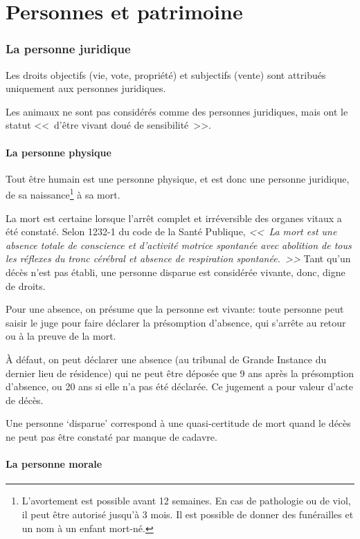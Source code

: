 \documentclass[10pt,a4paper]{article}
\begin{document}
\part{Personnes et patrimoine}

\section{La personne juridique}

Les droits objectifs (vie, vote, propriété) et subjectifs (vente) sont attribués uniquement aux personnes juridiques.

Les animaux ne sont pas considérés comme des personnes juridiques, mais ont le statut <<~d'être vivant doué de sensibilité~>>.

\subsection{La personne physique\label{personne-phys}}

Tout être humain est une personne physique, et est donc une personne juridique, de sa naissance\footnote{L'avortement est possible avant 12 semaines. En cas de pathologie ou de viol, il peut être autorisé jusqu'à 3 mois. Il est possible de donner des funérailles et un nom à un enfant mort-né.} à sa mort.

La mort est certaine lorsque l'arrêt complet et irréversible des organes vitaux a été constaté. Selon 1232-1 du code de la Santé Publique, \textit{<<~La mort est une absence totale de conscience et d'activité motrice spontanée avec abolition de tous les réflexes du tronc cérébral et absence de respiration spontanée.~>>} Tant qu'un décès n'est pas établi, une personne disparue est considérée vivante, donc, digne de droits.

Pour une absence, on présume que la personne est vivante: toute personne peut saisir le juge pour faire déclarer la présomption d'absence, qui s'arrête au retour ou à la preuve de la mort.

À défaut, on peut déclarer une absence (au tribunal de Grande Instance du dernier lieu de résidence) qui ne peut être déposée que 9 ans après la présomption d'absence, ou 20 ans si elle n'a pas été déclarée. Ce jugement a pour valeur d'acte de décès.

Une personne `disparue' correspond à une quasi-certitude de mort quand le décès ne peut pas être constaté par manque de cadavre.

\subsection{La personne morale\label{personne-mor}}
\end{document}
